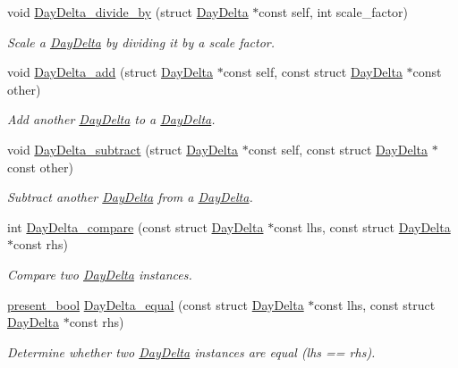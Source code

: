 \begin{DoxyCompactItemize}
void \hyperlink{day-delta_8h_a03f5153b765a355870053d9cf1ce5c78}{Day\-Delta\-\_\-divide\-\_\-by} (struct \hyperlink{structDayDelta}{Day\-Delta} $\ast$const self, int scale\-\_\-factor)
\begin{DoxyCompactList}\small\item\em Scale a \hyperlink{structDayDelta}{Day\-Delta} by dividing it by a scale factor. \end{DoxyCompactList}\item 
void \hyperlink{day-delta_8h_a1d879b02971a0c302622e56b577ceb23}{Day\-Delta\-\_\-add} (struct \hyperlink{structDayDelta}{Day\-Delta} $\ast$const self, const struct \hyperlink{structDayDelta}{Day\-Delta} $\ast$const other)
\begin{DoxyCompactList}\small\item\em Add another \hyperlink{structDayDelta}{Day\-Delta} to a \hyperlink{structDayDelta}{Day\-Delta}. \end{DoxyCompactList}\item 
void \hyperlink{day-delta_8h_a6fd32ca3c633ebe279df2a468fd1d91e}{Day\-Delta\-\_\-subtract} (struct \hyperlink{structDayDelta}{Day\-Delta} $\ast$const self, const struct \hyperlink{structDayDelta}{Day\-Delta} $\ast$const other)
\begin{DoxyCompactList}\small\item\em Subtract another \hyperlink{structDayDelta}{Day\-Delta} from a \hyperlink{structDayDelta}{Day\-Delta}. \end{DoxyCompactList}\item 
int \hyperlink{day-delta_8h_a9c2839c462e80f6419bb9e55f1744eab}{Day\-Delta\-\_\-compare} (const struct \hyperlink{structDayDelta}{Day\-Delta} $\ast$const lhs, const struct \hyperlink{structDayDelta}{Day\-Delta} $\ast$const rhs)
\begin{DoxyCompactList}\small\item\em Compare two \hyperlink{structDayDelta}{Day\-Delta} instances. \end{DoxyCompactList}\item 
\hyperlink{types_8h_a1c24e2cdd988b886e889080ded176ae0}{present\-\_\-bool} \hyperlink{day-delta_8h_aec7bbfd9ee83f64b94117028c4d856f5}{Day\-Delta\-\_\-equal} (const struct \hyperlink{structDayDelta}{Day\-Delta} $\ast$const lhs, const struct \hyperlink{structDayDelta}{Day\-Delta} $\ast$const rhs)
\begin{DoxyCompactList}\small\item\em Determine whether two \hyperlink{structDayDelta}{Day\-Delta} instances are equal (lhs == rhs). \end{DoxyCompactList}\item 

\end{DoxyCompactItemize}
